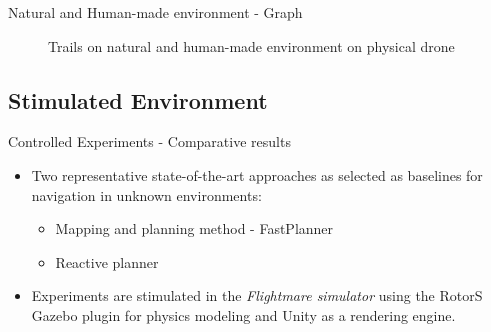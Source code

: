 \documentclass{beamer}
\begin{document}
\begin{frame}{Natural and Human-made environment - Graph }
	\begin{figure}
		\caption{Trails on natural and human-made environment on physical drone}
	\end{figure}
\end{frame}

\subsection{Stimulated Environment}
\begin{frame}{Controlled Experiments - Comparative results}
	\begin{itemize}
		\item Two representative state-of-the-art approaches as selected as baselines for navigation in unknown environments: 
		\begin{itemize}
			\item Mapping and planning method - FastPlanner
			\item Reactive planner
		\end{itemize}
	
		\item Experiments are stimulated in the \textit{Flightmare simulator} using the RotorS Gazebo plugin for physics modeling and Unity as a rendering engine.
		
	\end{itemize}
\end{frame}
\end{document}
